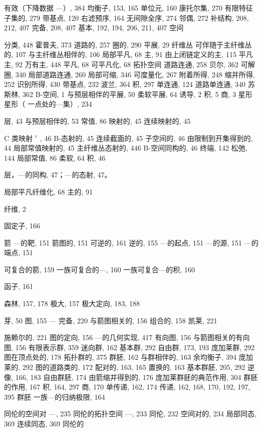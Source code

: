 有效（下降数据 ---）, 384 均衡子, 153, 165 单位元, 160 康托尔集, 270 有限特征子集的, 279 带基点, 120 右滤预序, 164 无间隙全序, 274 邻偶, 272 补结构, 208, 212, 407 完备, 208, 407 基本, 192, 194, 206, 211, 407 空间

分类, 448 霍普夫, 373 道路的, 257 圈的, 290 平展, 29 纤维丛 可伴随于主纤维丛的, 107 与主纤维丛相伴的, 106 局部平凡, 68 主, 91 由上闭链定义的主, 115 平凡主, 92 万有主, 448 平凡, 68 可平凡化, 68 拓扑空间 道路连通, 258 贝尔, 362 可解圈, 340 局部道路连通, 260 局部可缩, 346 可度量化, 267 附着所得, 248 缩并所得, 252 识别所得, 430 带基点, 232 波兰, 364 积, 297 单连通, 124 道路单连通, 340 苏斯林, 362 B-空间, 1 与预层相伴的平展, 50 柔软平展, 64 诱导, 2 积, 5 商, 3 星形 星形（ 一点处的---集）, 234


层, 43 与预层相伴的, 53 常值, 86 映射的, 45 连续映射的, 45

C 类映射 \(^{r}\) , 46 B-态射的, 45 连续截面的, 45 子空间的, 46 由限制到开集得到的, 44 局部常值映射的, 45 主纤维丛态射的, 446 B-空间同构的, 46 终端, 142 松弛, 144 局部常值, 86 柔软, 64 积, 46

层，---的同构, 47；---的态射, 47。

局部平凡纤维化, 68 主的, 91

纤维, 2

固定子, 166

箭 ---的靶, 151 箭图的, 151 可逆的, 161 逆的, 155 ---的起点, 151 ---的源, 151 ---的端点, 151

可复合的箭, 159 一族可复合的---, 160 一族可复合---的积, 160

函子, 161

森林, 157, 178 极大, 157 极大定向, 183, 188


芽, 50 图, 155 --- 完备, 220 与箭图相关的, 156 组合的, 158 凯莱, 221

施赖尔的, 221 图的定向, 156 ---的几何实现, 417 有向图, 156 与箭图相关的有向图, 156 有限表示群, 359 迷向群, 162 基本群, 292 自由群, 173, 193 庞加莱群, 292 图在顶点处的, 178 拓扑群的, 375 群胚, 162 与群相伴的, 163 余均衡子, 394 庞加莱的, 292 图的道路类的, 172 配对的, 163, 165 置换的, 163 基本群胚, 205, 292 逆像, 166, 183 自由群胚, 174 由箭缩并得到的, 176 庞加莱群胚的典范作用, 304 群胚的作用, 167 积, 164, 297 商, 170 单传递, 162, 174 传递, 162, 168, 170, 192, 197, 395 群胚 一族---的归纳极限, 164


同伦的空间对 ---, 235 同伦的拓扑空间 ---, 233 同伦, 232 空间对的, 234 局部同态, 369 连续同态, 369 同伦的

